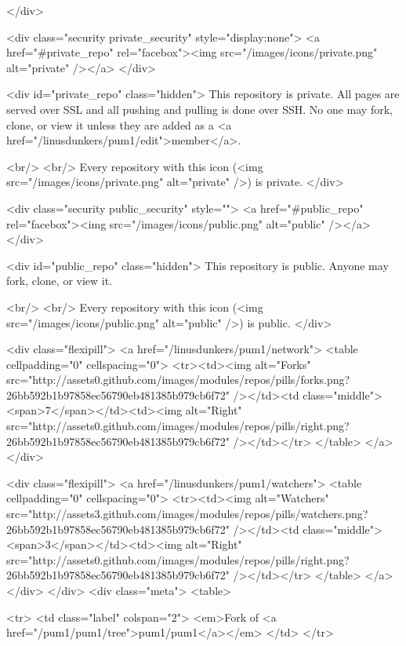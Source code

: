         
      </div>

      <div class="security private_security" style="display:none">
        <a href="#private_repo" rel="facebox"><img src="/images/icons/private.png" alt="private" /></a>
      </div>

      <div id="private_repo" class="hidden">
        This repository is private.
        All pages are served over SSL and all pushing and pulling is done over SSH.
        No one may fork, clone, or view it unless they are added as a <a href="/linusdunkers/pum1/edit">member</a>.

        <br/>
        <br/>
        Every repository with this icon (<img src="/images/icons/private.png" alt="private" />) is private.
      </div>

      <div class="security public_security" style="">
        <a href="#public_repo" rel="facebox"><img src="/images/icons/public.png" alt="public" /></a>
      </div>

      <div id="public_repo" class="hidden">
        This repository is public.
        Anyone may fork, clone, or view it.

        <br/>
        <br/>
        Every repository with this icon (<img src="/images/icons/public.png" alt="public" />) is public.
      </div>

      

      <div class="flexipill">
        <a href="/linusdunkers/pum1/network">
        <table cellpadding="0" cellspacing="0">
          <tr><td><img alt="Forks" src="http://assets0.github.com/images/modules/repos/pills/forks.png?26bb592b1b97858ec56790eb481385b979cb6f72" /></td><td class="middle"><span>7</span></td><td><img alt="Right" src="http://assets0.github.com/images/modules/repos/pills/right.png?26bb592b1b97858ec56790eb481385b979cb6f72" /></td></tr>
        </table>
        </a>
      </div>

      <div class="flexipill">
        <a href="/linusdunkers/pum1/watchers">
        <table cellpadding="0" cellspacing="0">
          <tr><td><img alt="Watchers" src="http://assets3.github.com/images/modules/repos/pills/watchers.png?26bb592b1b97858ec56790eb481385b979cb6f72" /></td><td class="middle"><span>3</span></td><td><img alt="Right" src="http://assets0.github.com/images/modules/repos/pills/right.png?26bb592b1b97858ec56790eb481385b979cb6f72" /></td></tr>
        </table>
        </a>
      </div>
    </div>
    <div class="meta">
      <table>
        
          <tr>
            <td class="label" colspan="2">
              <em>Fork of <a href="/pum1/pum1/tree">pum1/pum1</a></em>
            </td>
          </tr>
        

